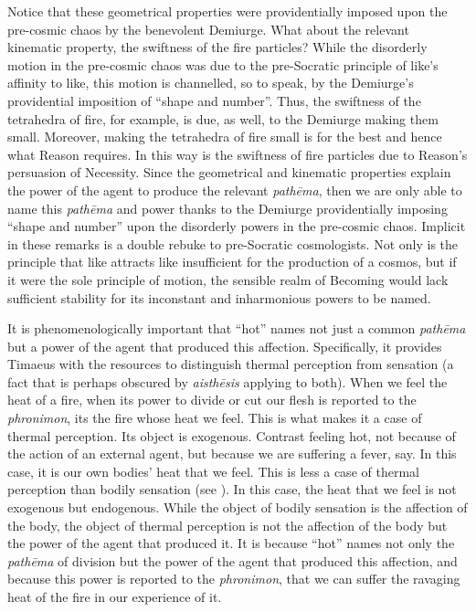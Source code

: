 Notice that these geometrical properties were providentially imposed upon the pre-cosmic chaos by the benevolent Demiurge. What about the relevant kinematic property, the swiftness of the fire particles? While the disorderly motion in the pre-cosmic chaos was due to the pre-Socratic principle of like's affinity to like, this motion is channelled, so to speak, by the Demiurge's providential imposition of ``shape and number''. Thus, the swiftness of the tetrahedra of fire, for example, is due, as well, to the Demiurge making them small. Moreover, making the tetrahedra of fire small is for the best and hence what Reason requires. In this way is the swiftness of fire particles due to Reason's persuasion of Necessity. Since the geometrical and kinematic properties explain the power of the agent to produce the relevant \emph{pathēma}, then we are only able to name this \emph{pathēma} and power thanks to the Demiurge providentially imposing ``shape and number'' upon the disorderly powers in the pre-cosmic chaos. Implicit in these remarks is a double rebuke to pre-Socratic cosmologists. Not only is the principle that like attracts like insufficient for the production of a cosmos, but if it were the sole principle of motion, the sensible realm of Becoming would lack sufficient stability for its inconstant and inharmonious powers to be named.

It is phenomenologically important that ``hot'' names not just a common \emph{pathēma} but a power of the agent that produced this affection. Specifically, it provides Timaeus with the resources to distinguish thermal perception from sensation (a fact that is perhaps obscured by \emph{aisthēsis} applying to both). When we feel the heat of a fire, when its power to divide or cut our flesh is reported to the \emph{phronimon}, its the fire whose heat we feel. This is what makes it a case of thermal perception. Its object is exogenous. Contrast feeling hot, not because of the action of an external agent, but because we are suffering a fever, say. In this case, it is our own bodies' heat that we feel. This is less a case of thermal perception than bodily sensation (see \citealt{Yrjonsuuri:2008aa}). In this case, the heat that we feel is not exogenous but endogenous. While the object of bodily sensation is the affection of the body, the object of thermal perception is not the affection of the body but the power of the agent that produced it.  It is because ``hot'' names not only the \emph{pathēma} of division but the power of the agent that produced this affection, and because this power is reported to the \emph{phronimon}, that we can suffer the ravaging heat of the fire in our experience of it.

